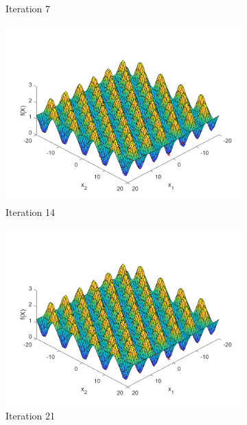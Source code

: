 \begin{figure}
\begin{subfigure}[b]{0.4\textwidth}
   \caption{Iteration 7}
   \label{fig:s3-iter-1}
 \end{subfigure}
 \begin{subfigure}[b]{0.4\textwidth}
   \includegraphics[width=\textwidth]{img/smpl/grwnk2d/loa-iter-14}
   \caption{Iteration 14}
   \label{fig:s3-iter-2}
 \end{subfigure}
 \begin{subfigure}[b]{0.4\textwidth}
   \includegraphics[width=\textwidth]{img/smpl/grwnk2d/loa-iter-21}
   \caption{Iteration 21}
   \label{fig:s3-iter-3}
 \end{subfigure}
 \begin{subfigure}[b]{0.4\textwidth}

\end{subfigure}
\end{figure}
